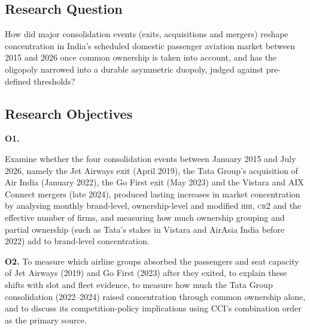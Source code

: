 \documentclass[12pt,a4paper]{article}
\newenvironment{authorcontribution}[1]{\par\begingroup\color{#1}}{\par\endgroup}
\newcommand{\HHI}{\textsc{hhi}}
\newcommand{\CRtwo}{\textsc{cr2}}
\begin{document}
\subsection{Research Question}
How did major consolidation events (exits, acquisitions and mergers) reshape concentration in India's scheduled domestic passenger aviation market between 2015 and 2026 once common ownership is taken into account, and has the oligopoly narrowed into a durable asymmetric duopoly, judged against pre-defined thresholds?

\subsection{Research Objectives}
\begin{authorcontribution}{authorSowmya}
\begin{minipage}{\linewidth}
\hypertarget{objective:1}{\textbf{O1.}} Examine whether the four consolidation events between January 2015 and July 2026, namely the Jet Airways exit (April 2019), the Tata Group's acquisition of Air India (January 2022), the Go First exit (May 2023) and the Vistara and AIX Connect mergers (late 2024), produced lasting increases in market concentration by analysing monthly brand-level, ownership-level and modified \HHI{}, \CRtwo{} and the effective number of firms, and measuring how much ownership grouping and partial ownership (such as Tata's stakes in Vistara and AirAsia India before 2022) add to brand-level concentration.
\par\end{minipage}
\end{authorcontribution}

\begin{authorcontribution}{authorMeena}
\begin{minipage}{\linewidth}
{\hypertarget{objective:2}{\textbf{O2.}} To measure which airline groups absorbed the passengers and seat capacity of Jet Airways (2019) and Go First (2023) after they exited, to explain these shifts with slot and fleet evidence, to measure how much the Tata Group consolidation (2022–2024) raised concentration through common ownership alone, and to discuss its competition-policy implications using CCI’s combination order as the primary source.}
\par\end{minipage}
\end{authorcontribution}
\end{document}
